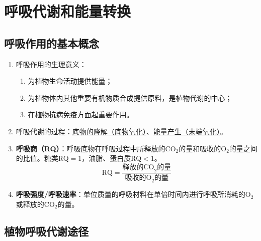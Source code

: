 \chapter{呼吸代谢和能量转换}

\section{呼吸作用的基本概念}
\begin{enumerate}
    \item 呼吸作用的生理意义：
    \begin{enumerate}
        \item 为植物生命活动提供能量；
        \item 为植物体内其他重要有机物质合成提供原料，是植物代谢的中心；
        \item 在植物抗病免疫方面起重要作用。
    \end{enumerate}
    \item 呼吸代谢的过程：\uline{底物的降解（底物氧化）}、\uline{能量产生（末端氧化）}。
    \item \textbf{呼吸商（RQ）}：呼吸底物在呼吸过程中所释放的CO$_2$的量和吸收的O$_2$的量之间的比值。糖类RQ$=1$，油脂、蛋白质RQ$<1$。
    \[
        \text{RQ}=\frac{\text{释放的CO}_2\text{的量}}{\text{吸收的O}_2\text{的量}}
    \]
    \item \textbf{呼吸强度/呼吸速率}：单位质量的呼吸材料在单倍时间内进行呼吸所消耗的O$_2$或释放的CO$_2$的量。
\end{enumerate}

\section{植物呼吸代谢途径}
